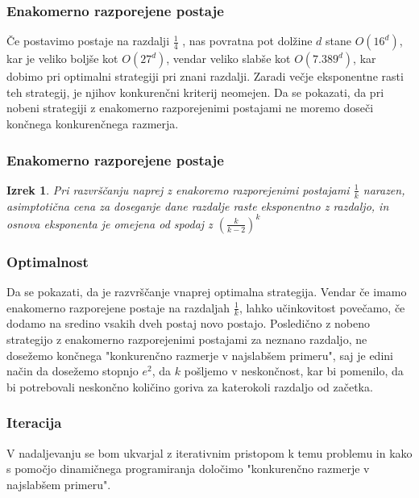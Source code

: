 \documentclass{beamer}
\newtheorem{izrek}{Izrek}
\begin{document}
 \begin{frame}
    \frametitle{Enakomerno razporejene postaje}
    Če postavimo postaje na razdalji  $\frac{1}{4}$ , nas povratna pot dolžine $d$ stane $O(16^d)$,
    kar je veliko boljše kot $O(27^d)$, vendar veliko slabše kot $O(7.389^d)$, kar dobimo pri optimalni strategiji
    pri znani razdalji. Zaradi večje eksponentne rasti teh strategij, je njihov konkurenčni kriterij neomejen.
    Da se pokazati, da pri nobeni strategiji z enakomerno razporejenimi postajami ne moremo doseči končnega 
    konkurenčnega razmerja.
\end{frame}


 \begin{frame}
    \frametitle{Enakomerno razporejene postaje}
    \begin{izrek}
        Pri razvrščanju naprej z enakoremo razporejenimi postajami $\frac{1}{k}$ narazen, asimptotična
        cena za doseganje dane razdalje raste eksponentno z razdaljo, in osnova eksponenta je omejena od spodaj z
         $(\frac{k}{k-2})^k$
    \end{izrek}
\end{frame}

 \begin{frame}
    \frametitle{Optimalnost}
    Da se pokazati, da je razvrščanje vnaprej optimalna strategija. Vendar če imamo enakomerno razporejene 
    postaje na razdaljah $\frac{1}{k}$, lahko učinkovitost povečamo, če dodamo na sredino vsakih dveh postaj novo postajo. 
    Posledično z nobeno strategijo z enakomerno razporejenimi postajami za neznano razdaljo, ne dosežemo končnega "konkurenčno 
    razmerje v najslabšem primeru", saj je edini način da dosežemo stopnjo $e^{2}$, da $k$ pošljemo v neskončnost, kar bi 
    pomenilo, da bi potrebovali neskončno količino goriva za katerokoli razdaljo od začetka.
    \end{frame}

 \begin{frame}
    \frametitle{Iteracija}
    V nadaljevanju se bom ukvarjal z iterativnim pristopom k temu problemu in kako s pomočjo dinamičnega programiranja  
    določimo "konkurenčno razmerje v najslabšem primeru".
   \end{frame}
\end{document}
